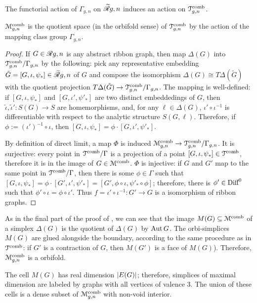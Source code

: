 The functorial action of $\Gamma_{g,n}$ on $\mathscr{\widetilde R}_{}{g,n}$ induces an action
on $\mathcal{T}\sp{\text{comb}}_{g,n}$.
\begin{lemma}
  \label{lemma:penner-kontsevich-bridge}
  $\mathcal{M}\sp{\text{comb}}_{g,n}$ is the quotient space (in the orbifold sense) of
  $\mathcal{T}\sp{\text{comb}}_{g,n}$ by the action of the mapping class group $\Gamma_{g,n}$.
\end{lemma}
\begin{proof}
  If $G \in \mathscr{R}_{}{g,n}$ is any abstract ribbon graph, then map $\Delta(G)$ into
  $\mathcal{T}\sp{\text{comb}}_{g,n} / \Gamma_{g,n}$ by the following: pick any representative
  embedding ${\tilde G} = [G, \iota, \psi_*] \in \mathscr{\widetilde R}_{}{g,n}$ of $G$ and compose
  the isomorphism $\Delta(G) \cong T\Delta(\tilde G)$ with the quotient
  projection $T\Delta(\tilde G) \to \mathcal{T}\sp{\text{comb}}_{g,n}/\Gamma_{g,n}$.  The mapping
  is well-defined: if $[G, \iota, \psi_*]$ and $[G, \iota', \psi'_*]$ are two
  distinct embeddedings of $G$, then ${\tilde \iota}, {\tilde \iota'}: S(G) \to
  S$ are homemorphisms, and, for any $\ell \in \Delta(G)$, $\iota' \circ \iota^{-1}$ is
  differentiable with respect to the analytic structure $S(G, \ell)$.
  Therefore, if $\phi := (\iota')^{-1} \circ \iota$, then $[G, \iota, \psi_*] = \phi \cdot [G, \iota',
  \psi'_*]$.

  By definition of direct limit, a map $\Phi$ is induced $\mathcal{M}\sp{\text{comb}}_{g,n} \to
  \mathcal{T}\sp{\text{comb}}_{g,n} / \Gamma_{g,n}$.  It is surjective: every point in $\mathcal{T}\sp{\text{comb}} /
  \Gamma$ is a projection of a point $[G, \iota, \psi_*] \in \mathcal{T}\sp{\text{comb}}$, therefore it
  is in the image of $G \in \mathcal{M}\sp{\text{comb}}$.  $\Phi$ is injective: if $G$ and $G'$
  map to the same point in $\mathcal{T}\sp{\text{comb}} / \Gamma$, then there is some $\phi \in \Gamma$
  such that $[G, \iota, \psi_*] = \phi \cdot [G', \iota', \psi'_*] = [G', \phi \circ \iota, \psi'_* \circ
  \phi]$; therefore, there is $\phi' \in \textrm{Diff}^0$ such that $\phi' \circ \iota = \phi \circ \iota'$.
  Thus $f = \iota' \circ \iota^{-1}: G' \to G$ is a isomorphism of ribbon
  graphs.
\end{proof}

As in the final part of the proof of
, we can see that the image
$M(G) \subseteq \mathcal{M}\sp{\text{comb}}$ of a simplex $\Delta(G)$ is the quotient of $\Delta(G)$ by $\operatorname{Aut}
G$.  The orbi-simplices $M(G)$ are glued alongside the boundary,
according to the same procedure as in $\mathcal{T}\sp{\text{comb}}$: if $G'$ is a
contraction of $G$, then $M(G')$ is a face of $M(G)$). Therefore,
$\mathcal{M}\sp{\text{comb}}_{g,n}$ is a orbifold.

The cell $M(G)$ has real dimension $\lvert E(G)\rvert$; therefore,
simplices of maximal dimension are labeled by graphs with all vertices
of valence $3$. The union of these cells is a dense subset of
$\mathcal{M}\sp{\text{comb}}_{g,n}$ with non-void interior.

